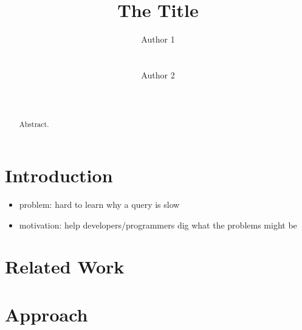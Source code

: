 \documentclass{chi2009}
\begin{document}
\setlength{\paperheight}{11in}
\setlength{\paperwidth}{8.5in}
\setlength{\pdfpageheight}{\paperheight}
\setlength{\pdfpagewidth}{\paperwidth}

\toappear{}

\title{The Title}
\author{
  \alignauthor Author 1\\
    \\
    \\
  \alignauthor Author 2\\
    \\
    \\
}

\maketitle

\begin{abstract}
  Abstract.
\end{abstract}



\section{Introduction}

\begin{itemize}
    \item problem: hard to learn why a query is slow
    \item motivation: help developers/programmers dig what the problems might be
\end{itemize}

\section{Related Work}




\section{Approach}
\end{document}
